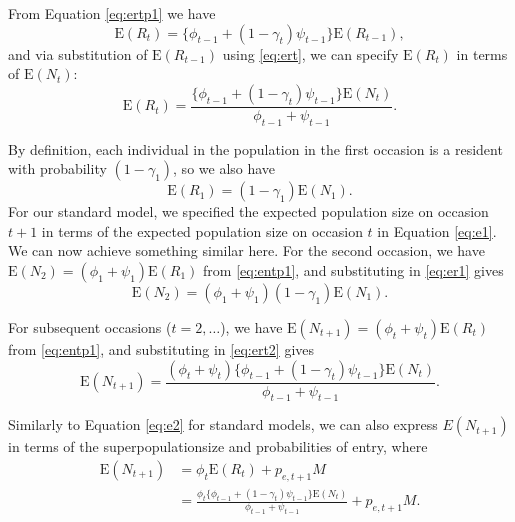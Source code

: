 \documentclass{article}
\newcommand{\E}[1]{\mathrm{E}(#1)}
\begin{document}
From Equation \eqref{eq:ertp1} we have
\begin{equation}
  \E{R_t} = \{ \phi_{t - 1} + (1 - \gamma_t) \psi_{t - 1}\} \E{R_{t - 1}}, \nonumber
\end{equation}
and via substitution of $\E{R_{t - 1}}$ using \eqref{eq:ert}, we can
specify $\E{R_t}$ in terms of $\E{N_t}$:
\begin{equation}
  \E{R_t} = \frac{\{ \phi_{t - 1} + (1 - \gamma_t) \psi_{t - 1}\}
    \E{N_t}}{\phi_{t - 1} + \psi_{t - 1}}. \label{eq:ert2}
\end{equation}

By definition, each individual in the population in the first occasion
is a resident with probability $(1 - \gamma_1)$, so we also have
\begin{equation}
\E{R_1} = (1 - \gamma_1) \E{N_1}. \label{eq:er1}
\end{equation}
For our standard model, we specified the expected population size on
occasion $t + 1$ in terms of the expected population size on occasion
$t$ in Equation \eqref{eq:e1}. We can now achieve something similar
here. For the second occasion, we have
$\E{N_2} = (\phi_1 + \psi_1) \E{R_1}$ from \eqref{eq:entp1}, and
substituting in \eqref{eq:er1} gives
\begin{equation}
  \E{N_2}  = (\phi_1 + \psi_1) (1 - \gamma_1) \E{N_1}. \label{eq:EN2t}
\end{equation}

For subsequent occasions ($t = 2, \ldots$), we have $\E{N_{t + 1}} =
(\phi_t + \psi_t) \E{R_t}$ from \eqref{eq:entp1}, and substituting in
\eqref{eq:ert2} gives
\begin{equation}
  \E{N_{t + 1}} = \frac{(\phi_t + \psi_t) \{ \phi_{t - 1} + (1 - \gamma_t) \psi_{t - 1}\}
    \E{N_t}}{\phi_{t - 1} + \psi_{t - 1}}. \label{eq:entp1n1}
\end{equation}

Similarly to Equation \eqref{eq:e2} for standard models, we can also express $E(N_{t + 1})$ in terms of the superpopulationsize and probabilities of entry, where
\begin{align}
  \E{N_{t + 1}} &= \phi_t \E{R_t} + p_{e, t + 1}M \\
                &= \frac{\phi_t \{ \phi_{t - 1} + (1 - \gamma_t) \psi_{t - 1}\}
                  \E{N_t}}{\phi_{t - 1} + \psi_{t - 1}} + p_{e, t + 1}M. \label{eq:entp1n2}
\end{align}
\end{document}
